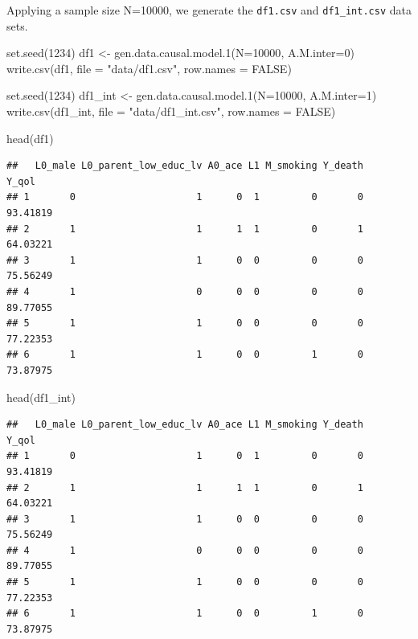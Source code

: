\documentclass[
]{book}
\newenvironment{Shaded}{\begin{snugshade}}{\end{snugshade}}
\newcommand{\AttributeTok}[1]{\textcolor[rgb]{0.77,0.63,0.00}{#1}}
\newcommand{\ConstantTok}[1]{\textcolor[rgb]{0.00,0.00,0.00}{#1}}
\newcommand{\DecValTok}[1]{\textcolor[rgb]{0.00,0.00,0.81}{#1}}
\newcommand{\FunctionTok}[1]{\textcolor[rgb]{0.00,0.00,0.00}{#1}}
\newcommand{\NormalTok}[1]{#1}
\newcommand{\OtherTok}[1]{\textcolor[rgb]{0.56,0.35,0.01}{#1}}
\newcommand{\StringTok}[1]{\textcolor[rgb]{0.31,0.60,0.02}{#1}}
\begin{document}
Applying a sample size N=10000, we generate the \texttt{df1.csv} and \texttt{df1\_int.csv} data sets.

\begin{Shaded}
\begin{Highlighting}[]
\FunctionTok{set.seed}\NormalTok{(}\DecValTok{1234}\NormalTok{)}
\NormalTok{df1 }\OtherTok{\textless{}{-}} \FunctionTok{gen.data.causal.model.1}\NormalTok{(}\AttributeTok{N=}\DecValTok{10000}\NormalTok{, }\AttributeTok{A.M.inter=}\DecValTok{0}\NormalTok{)}
\FunctionTok{write.csv}\NormalTok{(df1, }\AttributeTok{file =} \StringTok{"data/df1.csv"}\NormalTok{, }\AttributeTok{row.names =} \ConstantTok{FALSE}\NormalTok{)}

\FunctionTok{set.seed}\NormalTok{(}\DecValTok{1234}\NormalTok{)}
\NormalTok{df1\_int }\OtherTok{\textless{}{-}} \FunctionTok{gen.data.causal.model.1}\NormalTok{(}\AttributeTok{N=}\DecValTok{10000}\NormalTok{, }\AttributeTok{A.M.inter=}\DecValTok{1}\NormalTok{)}
\FunctionTok{write.csv}\NormalTok{(df1\_int, }\AttributeTok{file =} \StringTok{"data/df1\_int.csv"}\NormalTok{, }\AttributeTok{row.names =} \ConstantTok{FALSE}\NormalTok{)}
\end{Highlighting}
\end{Shaded}

\begin{Shaded}
\begin{Highlighting}[]
\FunctionTok{head}\NormalTok{(df1)}
\end{Highlighting}
\end{Shaded}

\begin{verbatim}
##   L0_male L0_parent_low_educ_lv A0_ace L1 M_smoking Y_death    Y_qol
## 1       0                     1      0  1         0       0 93.41819
## 2       1                     1      1  1         0       1 64.03221
## 3       1                     1      0  0         0       0 75.56249
## 4       1                     0      0  0         0       0 89.77055
## 5       1                     1      0  0         0       0 77.22353
## 6       1                     1      0  0         1       0 73.87975
\end{verbatim}

\begin{Shaded}
\begin{Highlighting}[]
\FunctionTok{head}\NormalTok{(df1\_int)}
\end{Highlighting}
\end{Shaded}

\begin{verbatim}
##   L0_male L0_parent_low_educ_lv A0_ace L1 M_smoking Y_death    Y_qol
## 1       0                     1      0  1         0       0 93.41819
## 2       1                     1      1  1         0       1 64.03221
## 3       1                     1      0  0         0       0 75.56249
## 4       1                     0      0  0         0       0 89.77055
## 5       1                     1      0  0         0       0 77.22353
## 6       1                     1      0  0         1       0 73.87975
\end{verbatim}
\end{document}
